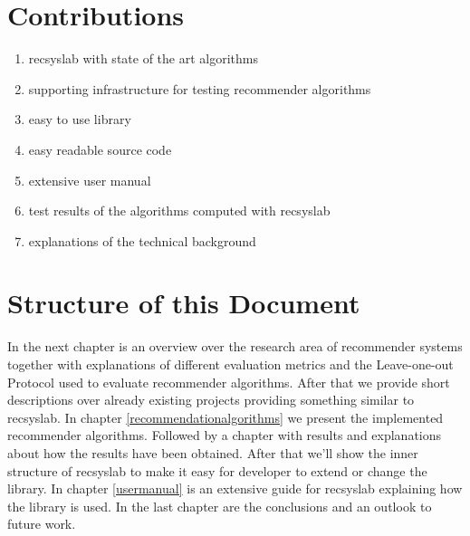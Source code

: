 \section{Contributions}

\begin{enumerate}
    \item recsyslab with state of the art algorithms
    \item supporting infrastructure for testing recommender algorithms
    \item easy to use library
    \item easy readable source code
    \item extensive user manual
    \item test results of the algorithms computed with recsyslab
    \item explanations of the technical background
\end{enumerate}


\section{Structure of this Document}
In the next chapter is an overview over the research area of recommender systems
together with explanations of different evaluation metrics and the Leave-one-out
Protocol used to evaluate recommender algorithms.
After that we provide short descriptions over already existing 
projects providing something similar to recsyslab.
In chapter \ref{recommendationalgorithms} we present the implemented recommender
algorithms. Followed by a chapter with results and explanations about how the
results have been obtained. After that we'll show the inner structure of recsyslab
to make it easy for developer to extend or change the library.
In chapter \ref{usermanual} is an extensive guide for recsyslab explaining
how the library is used.
In the last chapter are the conclusions and an outlook to future work.



